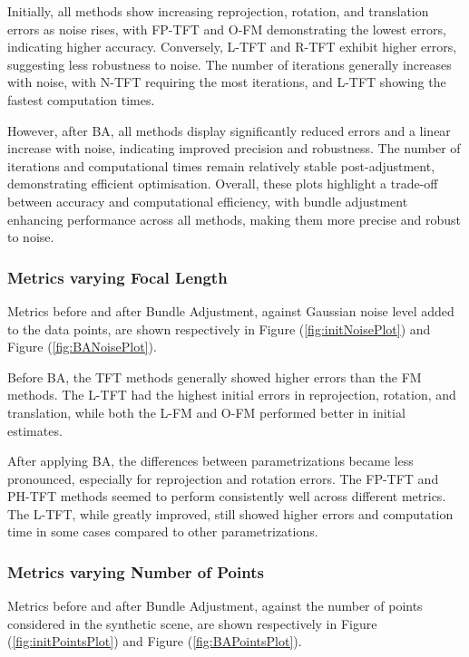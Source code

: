 Initially, all methods show increasing reprojection, rotation, and translation errors as noise rises, with \acs{FP-TFT} and \acs{O-FM} demonstrating the lowest errors, indicating higher accuracy. Conversely, \acs{L-TFT} and \acs{R-TFT} exhibit higher errors, suggesting less robustness to noise. The number of iterations generally increases with noise, with \acs{N-TFT} requiring the most iterations, and \acs{L-TFT} showing the fastest computation times.

However, after \acs{BA}, all methods display significantly reduced errors and a linear increase with noise, indicating improved precision and robustness. The number of iterations and computational times remain relatively stable post-adjustment, demonstrating efficient optimisation. Overall, these plots highlight a trade-off between accuracy and computational efficiency, with bundle adjustment enhancing performance across all methods, making them more precise and robust to noise.\\

\subsubsection*{Metrics varying Focal Length}
Metrics before and after Bundle Adjustment, against Gaussian noise level added to the data points, are shown respectively in Figure (\ref{fig:initNoisePlot}) and Figure (\ref{fig:BANoisePlot}).

Before \acs{BA}, the \acs{TFT} methods generally showed higher errors than the \acs{FM} methods. The \acs{L-TFT} had the highest initial errors in reprojection, rotation, and translation, while both the \acs{L-FM} and \acs{O-FM} performed better in initial estimates.

After applying \acs{BA}, the differences between parametrizations became less pronounced, especially for reprojection and rotation errors. The \acs{FP-TFT} and \acs{PH-TFT} methods seemed to perform consistently well across different metrics. The \acs{L-TFT}, while greatly improved, still showed higher errors and computation time in some cases compared to other parametrizations.\\

\subsubsection*{Metrics varying Number of Points}
Metrics before and after Bundle Adjustment, against the number of points considered in the synthetic scene, are shown respectively in Figure (\ref{fig:initPointsPlot}) and Figure (\ref{fig:BAPointsPlot}).

